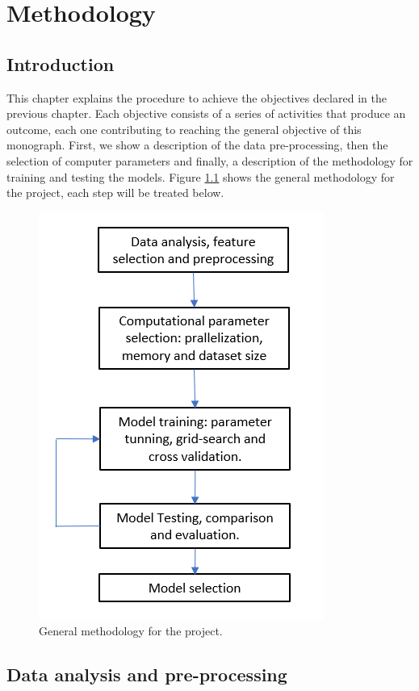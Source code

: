 \chapter{Methodology}
\section{Introduction}
This chapter explains the procedure to achieve the objectives declared in the previous chapter. Each objective consists of a series of activities that produce an outcome, each one contributing to reaching the general objective of this monograph. First, we show a description of the data pre-processing, then the selection of computer parameters and finally, a description of the methodology for training and testing the models. Figure \ref{fig:generalmet} shows the general methodology for the project, each step will be treated below.  

\begin{figure}[h!]
	\centering
	\includegraphics[width=0.5\linewidth]{TeX_files/Imagenes/general_met}
	\caption{General methodology for the project.}
	\label{fig:generalmet}
\end{figure}

\section{Data analysis and pre-processing}

